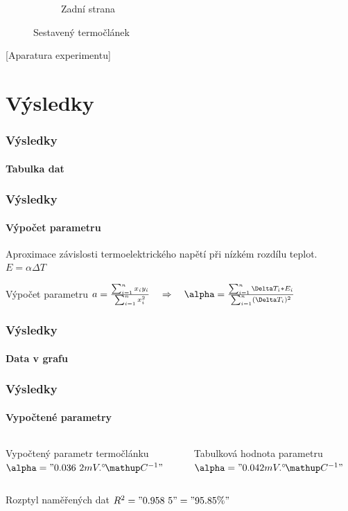\documentclass[smaller,aspectratio=1610,handout]{beamer}
\newcommand\sumi{\sum_{i=1}^n}
\begin{document}
\begin{frame}
\begin{figure}[htpb]
\begin{subfigure}{0.48\textwidth}
			\caption{Zadní strana}
		\end{subfigure}
		\hfill
		\caption{Sestavený termočlánek}
		\label{fig:termoclanek}
	\end{figure}
\end{frame}

\begin{frame}
	[Aparatura experimentu]
\end{frame}

\section{Výsledky}

\begin{frame}
	\frametitle{Výsledky}
	\framesubtitle{Tabulka dat}
	\hspace{0cm}\vfill
	\footnotesize
	
	\vfill
\end{frame}

\begin{frame}
	\frametitle{Výsledky}
	\framesubtitle{Výpočet parametru}
	\begin{block}{Aproximace závislosti termoelektrického napětí při nízkém rozdílu teplot.}
		\centering $E=\alpha\Delta T$
	\end{block}
	\begin{block}{Výpočet parametru}
		\centering $a=\frac{\sumi x_iy_i}{\sumi x_i^2}
		\ztoho \alpha=\frac{\sumi\Delta T_i*E_i}{\sumi (\Delta T_i)^2}$
	\end{block}
\end{frame}

\begin{frame}
	\frametitle{Výsledky}
	\framesubtitle{Data v grafu}
	\hspace{0cm}\vfill
	\small
	\vfill
\end{frame}

\begin{frame}
	\frametitle{Výsledky}
	\framesubtitle{Vypočtené parametry}
	\begin{columns}
		\begin{column}{0.46\textwidth}
			\begin{block}{Vypočtený parametr termočlánku}
				\centering $\alpha = "0.036~2 mV.\C^{-1}"$
			\end{block}
		\end{column}
		\begin{column}{0.46\textwidth}
			\begin{block}{Tabulková hodnota parametru}
				\centering $\alpha = "0.042 mV.\C^{-1}"$
			\end{block}
		\end{column}
	\end{columns}
	\begin{block}{Rozptyl naměřených dat}
		\centering $R^2="0.958~5"="95.85 \%"$
	\end{block}
\end{frame}
\end{document}
